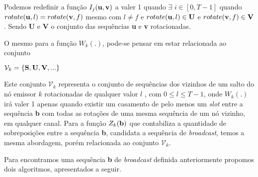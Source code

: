 Podemos redefinir a função $I_{j}({\bf u},{\bf v})$ a valer 1 quando $\exists$ $i \in [0,T-1]$ quando $rotate({\bf u},l) = rotate({\bf v},f)$ mesmo com $l \neq f$ e $rotate({\bf u},l) \in {\bf U}$ e $rotate({\bf v},f) \in {\bf V}$. Sendo {\bf U} e {\bf V} o conjunto das sequências {\bf u} e {\bf v} rotacionadas. 

O mesmo para a função $W_{k}(.)$, pode-se pensar em estar relacionada ao conjunto 
\vspace{0.3cm}

$\mathcal{V}_{k} = \{{\bf S},{\bf U},{\bf V},...\}$ 

\vspace{0.3cm}

Este conjunto $\mathcal{V}_{k}$ representa o conjunto de sequências dos vizinhos de um salto do nó emissor $k$ rotacionadas de qualquer valor $l$ , com $0 \leq l \leq T-1$, onde $W_{k}(.)$ irá valer 1 apenas quando existir um casamento de pelo menos um {\it slot} entre a sequência {\bf b} com todas as rotações de uma mesma sequência de um nó vizinho, em qualquer canal. Para a função $Z_{k}({\bf b})$ que contabiliza a quantidade de sobreposições entre a sequência {\bf b}, candidata a sequência de {\it broadcast}, temos a mesma abordagem, porém relacionada ao conjunto $\mathcal{V}_{k}$. 

Para encontramos uma sequência {\bf b} de {\it broadcast} definida anteriormente propomos dois algoritmos, apresentados a seguir. 










